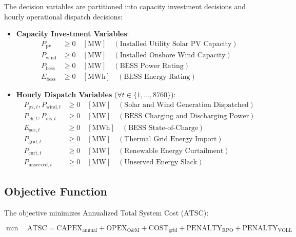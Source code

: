 \documentclass[11pt,a4paper]{article}
\begin{document}
The decision variables are partitioned into capacity investment decisions and hourly operational dispatch decisions:
\begin{itemize}
    \item \textbf{Capacity Investment Variables}:
    \begin{align}
    P_{\text{pv}} &\ge 0 \quad [\text{MW}] \quad (\text{Installed Utility Solar PV Capacity}) \\
    P_{\text{wind}} &\ge 0 \quad [\text{MW}] \quad (\text{Installed Onshore Wind Capacity}) \\
    P_{\text{bess}} &\ge 0 \quad [\text{MW}] \quad (\text{BESS Power Rating}) \\
    E_{\text{bess}} &\ge 0 \quad [\text{MWh}] \quad (\text{BESS Energy Rating})
    \end{align}
    \item \textbf{Hourly Dispatch Variables} ($\forall t \in \{1, \dots, 8760\}$):
    \begin{align}
    P_{\text{pv},t}, P_{\text{wind},t} &\ge 0 \quad [\text{MW}] \quad (\text{Solar and Wind Generation Dispatched}) \\
    P_{\text{ch},t}, P_{\text{dis},t} &\ge 0 \quad [\text{MW}] \quad (\text{BESS Charging and Discharging Power}) \\
    E_{\text{soc},t} &\ge 0 \quad [\text{MWh}] \quad (\text{BESS State-of-Charge}) \\
    P_{\text{grid},t} &\ge 0 \quad [\text{MW}] \quad (\text{Thermal Grid Energy Import}) \\
    P_{\text{curt},t} &\ge 0 \quad [\text{MW}] \quad (\text{Renewable Energy Curtailment}) \\
    P_{\text{unserved},t} &\ge 0 \quad [\text{MW}] \quad (\text{Unserved Energy Slack})
    \end{align}
\end{itemize}

\subsection{Objective Function}
\label{sec:obj}

The objective minimizes Annualized Total System Cost ($\text{ATSC}$):

\begin{equation}
\min \quad \text{ATSC} = \text{CAPEX}_{\text{annual}} + \text{OPEX}_{\text{O\&M}} + \text{COST}_{\text{grid}} + \text{PENALTY}_{\text{RPO}} + \text{PENALTY}_{\text{VOLL}}
\label{eq:obj}
\end{equation}
\end{document}
